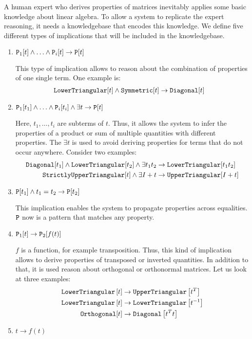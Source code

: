 A human expert who derives properties of matrices inevitably applies some basic knowledge about linear algebra. To allow a system to replicate the expert reasoning, it needs a knowledgebase that encodes this knowledge. We define five different types of implications that will be included in the knowledgebase.
%
\begin{enumerate}
\item $\text{\ttfamily P}_1[t] \land \ldots \land \text{\ttfamily P}_i[t] \rightarrow \text{\ttfamily P}[t]$

This type of implication allows to reason about the combination of properties of one single term. One example is:
%
\begin{align}
\text{\ttfamily LowerTriangular}[t] \land \text{\ttfamily Symmetric}[t] &\rightarrow \text{\ttfamily Diagonal}[t] 
\end{align}
\item $\text{\ttfamily P}_1[t_1] \land \ldots \land \text{\ttfamily P}_i[t_i] \land \exists t \rightarrow \text{\ttfamily P}[t] $

Here, $t_1,\ldots, t_i$ are subterms of $t$. Thus, it allows the system to infer the properties of a product or sum of multiple quantities with different properties. The $\exists t$ is used to avoid deriving properties for terms that do not occur anywhere. Consider two examples:
%
\begin{align}
\text{\ttfamily Diagonal}[t_1] \land \text{\ttfamily LowerTriangular}[t_2] \land \exists t_1 t_2 &\rightarrow \text{\ttfamily LowerTriangular}[t_1 t_2] \\
\text{\ttfamily StrictlyUpperTriangular}[t] \land \exists I + t &\rightarrow \text{\ttfamily UpperTriangular}[I + t]
\end{align}
\item $\text{\ttfamily P}[t_1] \land t_1 = t_2 \rightarrow \text{\ttfamily P}[t_2]$

This implication enables the system to propagate properties across equalities. $\text{\ttfamily P}$ now is a pattern that matches any property.
\item $\text{\ttfamily P}_1[t] \rightarrow \text{\ttfamily P}_2[f(t)]$

$f$ is a function, for example transposition. Thus, this kind of implication allows to derive properties of transposed or inverted quantities. In addition to that, it is used reason about orthogonal or orthonormal matrices. Let us look at three examples:
%
\begin{align}
\text{\ttfamily LowerTriangular} \left[t\right] &\rightarrow \text{\ttfamily UpperTriangular} \left[ t^T \right] \label{eqn:loTriTransposed}\\
\text{\ttfamily LowerTriangular} \left[t\right] &\rightarrow \text{\ttfamily LowerTriangular} \left[ t^{-1} \right] \\
\text{\ttfamily Orthogonal}[t] &\rightarrow \text{\ttfamily Diagonal}\left[t^T t \right]
\end{align}
\item $t \rightarrow f(t)$


\end{enumerate}
